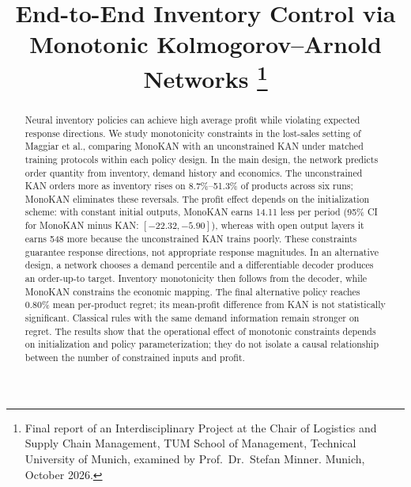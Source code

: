 \documentclass[conference]{IEEEtran}
\begin{document}
\title{End-to-End Inventory Control via Monotonic Kolmogorov--Arnold Networks%
\thanks{Final report of an Interdisciplinary Project at the Chair of Logistics and Supply Chain Management, TUM
School of Management, Technical University of Munich, examined by Prof.~Dr.~Stefan Minner. Munich, October 2026.}}

\author{
\and
{}
}

\maketitle

\begin{abstract}
Neural inventory policies can achieve high average profit while violating expected response directions. We study
monotonicity constraints in the lost-sales setting of Maggiar et al., comparing MonoKAN with an unconstrained KAN
under matched training protocols within each policy design. In the main design, the network predicts order quantity
from inventory, demand history and economics. The unconstrained KAN orders more as inventory rises on 8.7\%--51.3\%
of products across six runs; MonoKAN eliminates these reversals. The profit effect depends on the initialization
scheme: with constant initial outputs, MonoKAN earns 14.11 less per period (95\% CI for MonoKAN minus KAN:
$[-22.32,-5.90]$), whereas with open output layers it earns 548 more because the unconstrained KAN trains poorly.
These constraints guarantee response directions, not appropriate response magnitudes. In an alternative design, a
network chooses a demand percentile and a differentiable decoder produces an order-up-to target. Inventory
monotonicity then follows from the decoder, while MonoKAN constrains the economic mapping. The final alternative
policy reaches 0.80\% mean per-product regret; its mean-profit difference from KAN is not statistically significant.
Classical rules with the same demand information remain stronger on regret. The results show that the operational
effect of monotonic constraints depends on initialization and policy parameterization; they do not isolate a causal
relationship between the number of constrained inputs and profit.
\end{abstract}
\end{document}
